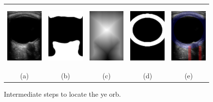\documentclass{llncs}
\begin{document}
\begin{figure}
\centering
\begin{tabular}{ccccc}
\includegraphics[height=1.32in]{019.png} &
\includegraphics[height=1.32in]{019-eye-smooth.png} &
\includegraphics[height=1.32in]{019-eye-distance.png} &         
\includegraphics[height=1.32in]{019-eye-moving.png} &
\includegraphics[height=1.32in]{019-overlay.png}\\
(a) & (b) & (c) & (d) & (e)
\end{tabular}
\caption{
\label{fig:algorithm-eye}
Intermediate steps to locate the ye orb.
}
\end{figure}
\end{document}
